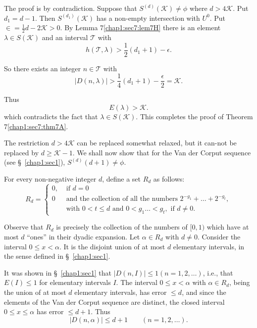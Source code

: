 \medskip
{} The proof is by contradiction. Suppose that $S^{(d)} (\mathcal{K}) \neq \phi$ where $d > 4\mathcal{K}$. Put $d_{1} = d-1$. Then $S^{(d_{1})} (\mathcal{K})$ has a non-empty intersection with $U^{0}$. Put $\in = \frac{1}{2} d - 2 \mathcal{K} > 0$. By Lemma 7\ref{chap1:sec7:lem7H} there is an element\pageoriginale $\lambda \in S(\mathcal{K})$ and an interval $\mathscr{T}$ with
$$
h(\mathscr{T}, \lambda) > \frac{1}{2} (d_{1} + 1) - \epsilon.
$$

So there exists an integer $n \in \mathscr{T}$ with
$$
|D(n, \lambda)| > \frac{1}{4} (d_{1} + 1) - \frac{\epsilon}{2} = \mathcal{K}.
$$

Thus
$$
E(\lambda) > \mathcal{K}.
$$
which contradicts the fact that $\lambda \in S(\mathcal{K})$. This completes the proof of Theorem 7\ref{chap1:sec7:thm7A}.

The restriction $d > 4\mathcal{K}$ can be replaced somewhat relaxed, but it can-not be replaced by $d \geq \mathcal{K}-1$. We shall now show that for the Van der Corput sequence (see \S\ \ref{chap1:sec1}), $S^{(d)} (d+1) \neq \phi$.

For every non-negative integer $d$, define a set $R_{d}$ as follows:
\begin{equation*}
 R_{d} = 
 \begin{cases}
  0, & \text{ if }d = 0\\
  0 & \text{ and the collection of all the numbers } 2^{-g_{1}} + \ldots + 2^{-g_{t}},\\
 & \text{ with }0 < t \leq d \text{ and }0 < g_{1} \ldots < g_{t}, \text{ if }d \neq 0.
 \end{cases}
\end{equation*}

Observe that $R_{d}$ is precisely the collection of the numbers of $[0, 1)$ which have at most $d$ ``ones'' in their dyadic expansion. Let $\alpha \in R_{d}$ with $d \neq 0$. Consider the interval $0 \leq x < \alpha$. It is the disjoint union of at most $d$ elementary intervals, in the sense defined in \S\ \ref{chap1:sec1}.

It was shown in \S\ \ref{chap1:sec1} that $|D(n, I)| \leq 1 (n = 1, 2, \ldots)$, i.e., that $E(I) \leq 1$ for elementary intervals $I$. The interval $0 \leq x < \alpha$ with $\alpha \in R_{d}$, being the union of at most $d$ elementary intervals, has error $\leq d$, and since the elements of the Van der Corput sequence are distinct, the closed interval $0 \leq x \leq \alpha$ has error $\leq d+1$. Thus
$$
|D(n, \alpha)| \leq d+1 \qquad (n = 1, 2, \ldots) .
$$\pageoriginale

